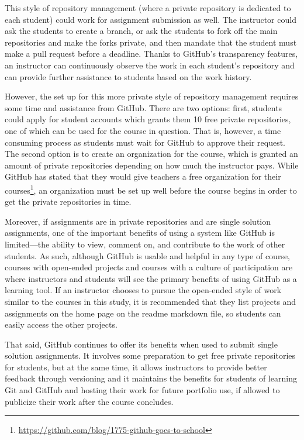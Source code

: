 This style of repository management (where a private repository is dedicated to each student) could work for assignment submission as well. The instructor could ask the students to create a branch, or ask the students to fork off the main repositories and make the forks private, and then mandate that the student must make a pull request before a deadline. Thanks to GitHub's transparency features, an instructor can continuously observe the work in each student's repository and can provide further assistance to students based on the work history.

However, the set up for this more private style of repository management requires some time and assistance from GitHub. There are two options: first, students could apply for student accounts which grants them 10 free private repositories, one of which can be used for the course in question. That is, however, a time consuming process as students must wait for GitHub to approve their request. The second option is to create an organization for the course, which is granted an amount of private repositories depending on how much the instructor pays. While GitHub has stated that they would give teachers a free organization for their courses\footnote{\url{https://github.com/blog/1775-github-goes-to-school}}, an organization must be set up well before the course begins in order to get the private repositories in time.

Moreover, if assignments are in private repositories and are single solution assignments, one of the important benefits of using a system like GitHub is limited---the ability to view, comment on, and contribute to the work of other students. As such, although GitHub is usable and helpful in any type of course, courses with open-ended projects and courses with a culture of participation are where instructors and students will see the primary benefits of using GitHub as a learning tool. If an instructor chooses to pursue the open-ended style of work similar to the courses in this study, it is recommended that they list projects and assignments on the home page on the readme markdown file, so students can easily access the other projects.

That said, GitHub continues to offer its benefits when used to submit single solution assignments. It involves some preparation to get free private repositories for students, but at the same time, it allows instructors to provide better feedback through versioning and it maintains the benefits for students of learning Git and GitHub and hosting their work for future portfolio use, if allowed to publicize their work after the course concludes. \\

